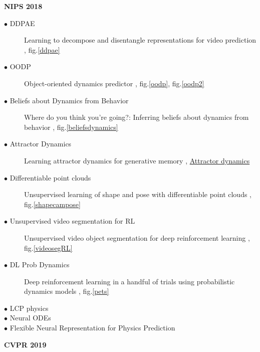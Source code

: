 \documentclass[12pt]{article}
\begin{document}
 {\LARGE\noindent\textbf{NIPS 2018}}
\begin{description}
  \item[$\bullet$ DDPAE] Learning to decompose and disentangle representations
    for video prediction \cite{hsieh2018learning}, fig.\ref{ddpae}
\item[$\bullet$ OODP] Object-oriented dynamics predictor
  \cite{kanazawa_2019_cvpr}, fig.\ref{oodp}, fig.\ref{oodp2}
\item[$\bullet$ Beliefs about Dynamics from Behavior] Where do you think you're going?: Inferring beliefs about dynamics from behavior \cite{reddy2018you}, fig.\ref{beliefsdynamics}
\item[$\bullet$ Attractor Dynamics] Learning attractor dynamics for generative
  memory \cite{wu2018learning}, \href{https://neuronaldynamics.epfl.ch/online/Ch17.html}{Attractor dynamics}
  

\item[$\bullet$ Differentiable point clouds] Unsupervised learning of shape and pose with differentiable point clouds \cite{insafutdinov2018unsupervised}, fig.\ref{shapecampose}

\item[$\bullet$ Unsupervised video segmentation for RL] Unsupervised video object segmentation for deep reinforcement learning \cite{goel2018unsupervised}, fig.\ref{videosegRL}


\item[$\bullet$ DL Prob Dynamics] Deep reinforcement learning in a handful of trials using probabilistic dynamics models \cite{chua2018deep}, fig.\ref{pets}
  
\item[$\bullet$ LCP physics \cite{de2018end}]

\item[$\bullet$ Neural ODEs \cite{chen2018neural}]

\item[$\bullet$ Flexible Neural Representation for Physics Prediction \cite{mrowca2018flexible}]


\end{description}

 
 {\LARGE\noindent\textbf{CVPR 2019}}
\end{document}
